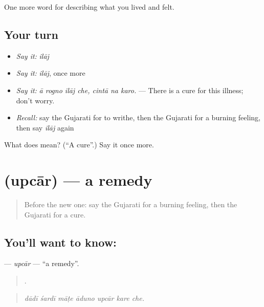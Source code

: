 \begin{grammarlens}[title={What you've built}]
One more word for describing what you lived and felt.
\end{grammarlens}

\subsection*{Your turn}
\begin{itemize}
\raggedright
  \item \emph{Say it:} \emph{ilāj}
  \item \emph{Say it:} \emph{ilāj}, once more
  \item \emph{Say it:} \emph{ā rogno ilāj che, cintā na karo.} — There is a cure for this illness; don't worry.
  \item \emph{Recall:} say the Gujarati for to writhe, then the Gujarati for a burning feeling, then say \emph{ilāj} again
\end{itemize}

\begin{tcolorbox}[breakable,colback=teal!4,colframe=teal!35!black,title={Before you move on}]
What does  mean? (\textquotedblleft{}A cure\textquotedblright{}.) Say it once more.
\end{tcolorbox}
\section[\texorpdfstring{\gu{ઉપચાર} (upcār)}{ઉપચાર (upcār)}]{ (upcār) — a remedy}

\label{lesson:GU-C484-upcar}



\begin{quote}
Before the new one: say the Gujarati for a burning feeling, then the Gujarati for a cure.
\end{quote}

\subsection*{You'll want to know: }
\textbf{} — \emph{upcār} — \textquotedblleft{}a remedy\textquotedblright{}.

\begin{quote}
      .
\end{quote}

\begin{quote}
\emph{dādī śardī māṭe āduno upcār kare che.}
\end{quote}

